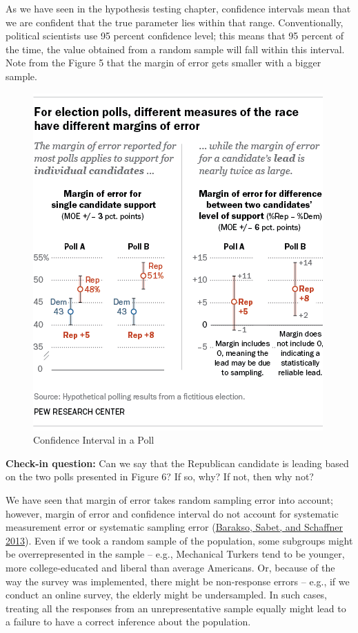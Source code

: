 \documentclass{book}
\begin{document}
As we have seen in the hypothesis testing chapter, confidence intervals mean
that we are confident that the true parameter lies within that range.
Conventionally, political scientists use 95 percent confidence level; this
means that 95 percent of the time, the value obtained from a random sample
will fall within this interval. Note from the Figure 5 that the margin of
error gets smaller with a bigger sample.

\begin{figure}
\hypertarget{fig:Confidence_interval}{%
\centering
\includegraphics{images/surveys/Confidence_interval.png}
\caption{Confidence Interval in a Poll}\label{fig:Confidence_interval}
}
\end{figure}

\textbf{Check-in question:} Can we say that the Republican candidate is
leading based on the two polls presented in Figure 6? If so, why? If not, then
why not?

We have seen that margin of error takes random sampling error into account;
however, margin of error and confidence interval do not account for systematic
measurement error or systematic sampling error
(\protect\hyperlink{ref-barakso2013understanding}{Barakso, Sabet, and
Schaffner 2013}). Even if we took a random sample of the population, some
subgroups might be overrepresented in the sample -- e.g., Mechanical Turkers
tend to be younger, more college-educated and liberal than average Americans.
Or, because of the way the survey was implemented, there might be non-response
errors -- e.g., if we conduct an online survey, the elderly might be
undersampled. In such cases, treating all the responses from an
unrepresentative sample equally might lead to a failure to have a correct
inference about the population.
\end{document}
